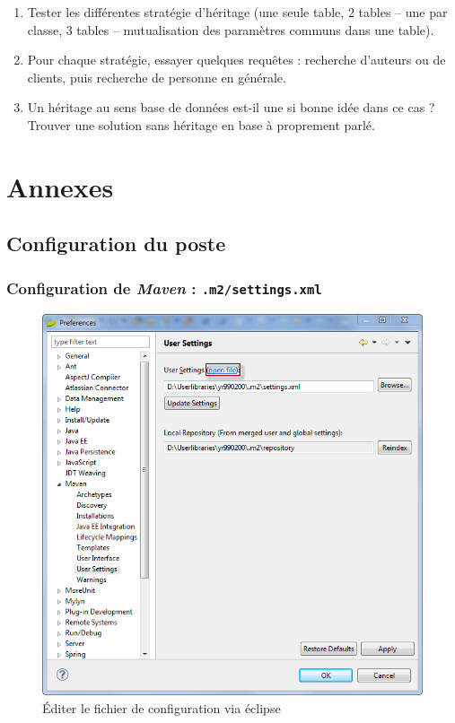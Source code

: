\documentclass[small,algo]{dushClass}
\begin{document}
\begin{enumerate}
\item Tester les différentes stratégie d'héritage (une seule table, 2 tables -- une par classe, 3 tables -- mutualisation des paramètres communs dans une table).
\item Pour chaque stratégie, essayer quelques requêtes : recherche d'auteurs ou de clients, puis recherche de personne en générale.
\item Un héritage au sens base de données est-il une si bonne idée dans ce cas ? Trouver une solution sans héritage en base à proprement parlé.
\end{enumerate}

\cleardoublepage
\section{Annexes}
\lstset{language=XML}

\subsection{Configuration du poste}

\subsubsection{Configuration de \emph{Maven} : \texttt{.m2/settings.xml}}\label{mvn-settings}

\begin{figure}[H]\label{mvn-settings-sts}
	\center
	\includegraphics{images/mvn_config.png}
	\caption{Éditer le fichier de configuration via éclipse}
\end{figure}
\end{document}
